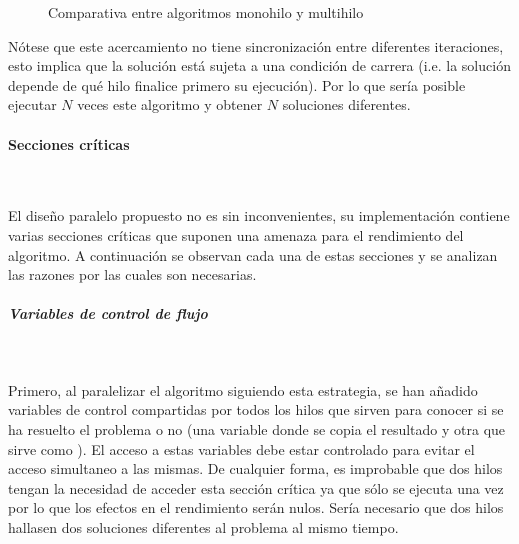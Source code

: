 \begin{figure}[h]
\begin{subfigure}{.5\textwidth}
\begin{center}
\end{center}
\end{subfigure}
\caption{Comparativa entre algoritmos monohilo y multihilo}
\label{fig:A*Comparison}
\end{figure}

\begin{notebox}
    Nótese que este acercamiento no tiene sincronización entre diferentes iteraciones,
    esto implica que la solución está sujeta a una condición de carrera
    (i.e. la solución depende de qué hilo finalice primero su ejecución).
    Por lo que sería posible ejecutar $N$ veces este algoritmo y obtener
    $N$ soluciones diferentes.
\end{notebox}

\paragraph{Secciones críticas}~

El diseño paralelo propuesto no es sin inconvenientes,
su implementación contiene varias secciones críticas que suponen
una amenaza para el rendimiento del algoritmo.
A continuación se observan cada una de estas secciones y se
analizan las razones por las cuales son necesarias.

\subparagraph{Variables de control de flujo}~

Primero, al paralelizar el algoritmo siguiendo esta estrategia,
se han añadido variables de control compartidas por todos
los hilos que sirven para conocer si se ha resuelto el problema
o no (una variable donde se copia el resultado y
otra que sirve como ).
El acceso a estas variables debe estar controlado
para evitar el acceso simultaneo a las mismas.
De cualquier forma, es improbable que dos hilos tengan
la necesidad de acceder esta sección crítica ya que sólo
se ejecuta una vez por lo que los efectos en el rendimiento serán nulos.
Sería necesario que dos hilos hallasen dos soluciones diferentes al
problema al mismo tiempo.

